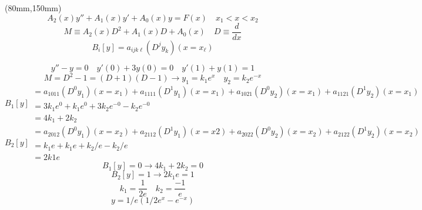 \begin{textblock*}{110mm}(80mm,150mm)
\[
  A_2(x) y'' + A_1(x) y' + A_0(x) y = F(x)  \quad x_1 < x < x_2
\]
\[
  M \equiv A_2(x) D^2 + A_1(x) D + A_0(x)  \quad D \equiv \frac{d}{dx} 
\]
\[
  B_i[y] = a_{ijk\ell} \left( D^j y_k \right) (x = x_{\ell} )
\]

\[
  y'' - y = 0 \quad y'(0) + 3 y(0) = 0 \quad y'(1) + y(1) = 1
\]
\[
  M = D^2 - 1 = (D + 1)(D -1) \rightarrow y_1 = k_1 e^x \quad y_2 = k_2 e^{-x}
\]
\[
  B_1[y]   \begin{array}{l}
               = a_{1011}(D^0 y_1)(x=x_1) + a_{1111}(D^1 y_1)(x=x_1) + a_{1021}(D^0 y_2)(x=x_1) + a_{1121}(D^1 y_2)(x=x_1) \\
               = 3 k_1 e^0 + k_1 e^0 + 3 k_2 e^{-0} - k_2 e^{-0} \\
               = 4 k_1 + 2 k_2
           \end{array}
\]
\[
  B_2[y]  \begin{array}{l}
              = a_{2012} (D^0 y_1)(x=x_2) + a_{2112} (D^1 y_1)(x=x2) + a_{2022} (D^0 y_2)(x=x_2) + a_{2122}(D^1y_2)(x=x_2) \\
              = k_1 e + k_1 e + k_2/e - k_2/e \\
              = 2 k1 e
          \end{array}
\]
\[
  B_1[y] = 0 \rightarrow 4 k_1 + 2 k_2 = 0 
\]
\[
  B_2[y] = 1 \rightarrow 2 k_1 e = 1
\] 
\[
  k_1 = \frac{1}{2 e} \quad k_2 = \frac{-1}{e}
\]
\[
  y = 1/e( 1/2e^x - e^{-x})
\]
\end{textblock*}
\newpage